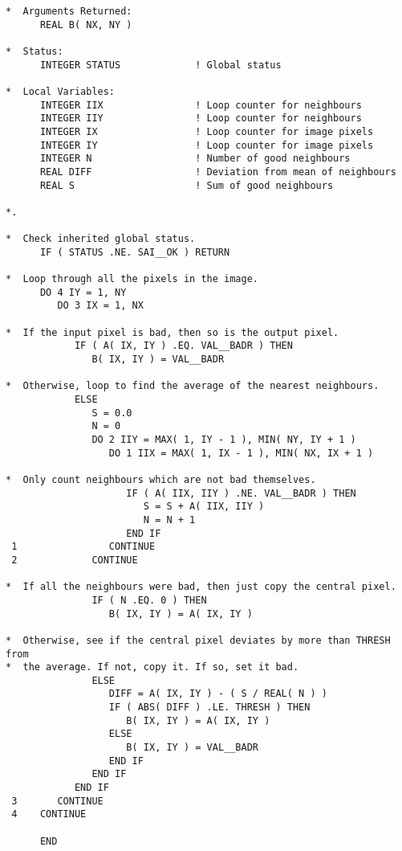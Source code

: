 \documentclass[twoside,11pt]{article}
\begin{document}
\begin{verbatim}
*  Arguments Returned:
      REAL B( NX, NY )

*  Status:
      INTEGER STATUS             ! Global status

*  Local Variables:
      INTEGER IIX                ! Loop counter for neighbours
      INTEGER IIY                ! Loop counter for neighbours
      INTEGER IX                 ! Loop counter for image pixels
      INTEGER IY                 ! Loop counter for image pixels
      INTEGER N                  ! Number of good neighbours
      REAL DIFF                  ! Deviation from mean of neighbours
      REAL S                     ! Sum of good neighbours

*.

*  Check inherited global status.
      IF ( STATUS .NE. SAI__OK ) RETURN

*  Loop through all the pixels in the image.
      DO 4 IY = 1, NY
         DO 3 IX = 1, NX

*  If the input pixel is bad, then so is the output pixel.
            IF ( A( IX, IY ) .EQ. VAL__BADR ) THEN
               B( IX, IY ) = VAL__BADR

*  Otherwise, loop to find the average of the nearest neighbours.
            ELSE
               S = 0.0
               N = 0
               DO 2 IIY = MAX( 1, IY - 1 ), MIN( NY, IY + 1 )
                  DO 1 IIX = MAX( 1, IX - 1 ), MIN( NX, IX + 1 )

*  Only count neighbours which are not bad themselves.
                     IF ( A( IIX, IIY ) .NE. VAL__BADR ) THEN
                        S = S + A( IIX, IIY )
                        N = N + 1
                     END IF
 1                CONTINUE
 2             CONTINUE

*  If all the neighbours were bad, then just copy the central pixel.
               IF ( N .EQ. 0 ) THEN
                  B( IX, IY ) = A( IX, IY )

*  Otherwise, see if the central pixel deviates by more than THRESH from
*  the average. If not, copy it. If so, set it bad.
               ELSE
                  DIFF = A( IX, IY ) - ( S / REAL( N ) )
                  IF ( ABS( DIFF ) .LE. THRESH ) THEN
                     B( IX, IY ) = A( IX, IY )
                  ELSE
                     B( IX, IY ) = VAL__BADR
                  END IF
               END IF
            END IF
 3       CONTINUE
 4    CONTINUE

      END
\end{verbatim}
\normalsize
\end{document}
